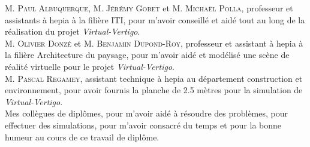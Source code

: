 \textsc{M. Paul Albuquerque}, \textsc{M. Jérémy Gobet} et \textsc{M. Michaël Polla}, professeur et assistants à hepia à la filière ITI, pour m'avoir conseillé et aidé tout au long de la réalisation du projet \textit{Virtual-Vertigo}. \\

\textsc{M. Olivier Donzé} et \textsc{M. Benjamin Dupond-Roy}, professeur et assistant à hepia à la filière Architecture du paysage, pour m'avoir aidé et modélisé une scène de réalité virtuelle pour le projet \textit{Virtual-Vertigo}. \\

\textsc{M. Pascal Regamey}, assistant technique à hepia au département construction et environnement, pour avoir fournis la planche de 2.5 mètres pour la simulation de \textit{Virtual-Vertigo}. \\

Mes collègues de diplômes, pour m'avoir aidé à résoudre des problèmes, pour effectuer des simulations, pour m'avoir consacré du temps et pour la bonne humeur au cours de ce travail de diplôme.